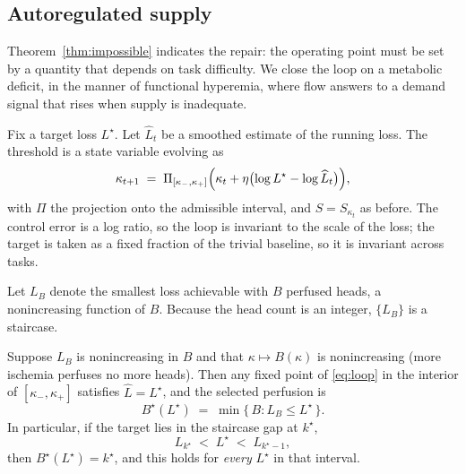 \subsection{Autoregulated supply}

Theorem~\ref{thm:impossible} indicates the repair: the operating point must be set by a
quantity that depends on task difficulty. We close the loop on a metabolic deficit, in
the manner of functional hyperemia, where flow answers to a demand signal that rises when
supply is inadequate.

\begin{definition}
\label{def:autoreg}
Fix a target loss $L^\star$. Let $\widehat{L}_t$ be a smoothed estimate of the running
loss. The threshold is a state variable evolving as
\begin{equation}
  \label{eq:loop}
  \kappa_{t+1} \;=\; \Pi_{[\kappa_-, \kappa_+]}\Bigl(
    \kappa_t + \eta \bigl( \log L^\star - \log \widehat{L}_t \bigr) \Bigr),
\end{equation}
with $\Pi$ the projection onto the admissible interval, and $S = S_{\kappa_t}$ as before.
The control error is a log ratio, so the loop is invariant to the scale of the loss; the
target is taken as a fixed fraction of the trivial baseline, so it is invariant across
tasks.
\end{definition}

Let $L_B$ denote the smallest loss achievable with $B$ perfused heads, a nonincreasing
function of $B$. Because the head count is an integer, $\{L_B\}$ is a staircase.

\begin{theorem}
\label{thm:autoreg}
Suppose $L_B$ is nonincreasing in $B$ and that $\kappa \mapsto B(\kappa)$ is nonincreasing
(more ischemia perfuses no more heads). Then any fixed point of \eqref{eq:loop} in the
interior of $[\kappa_-, \kappa_+]$ satisfies $\widehat{L} = L^\star$, and the selected
perfusion is
\begin{equation}
  B^\star(L^\star) \;=\; \min \{\, B : L_B \le L^\star \,\}.
\end{equation}
In particular, if the target lies in the staircase gap at $k^\star$,
\begin{equation}
  \label{eq:gap}
  L_{k^\star} \;<\; L^\star \;<\; L_{k^\star - 1},
\end{equation}
then $B^\star(L^\star) = k^\star$, and this holds for \emph{every} $L^\star$ in that
interval.
\end{theorem}

